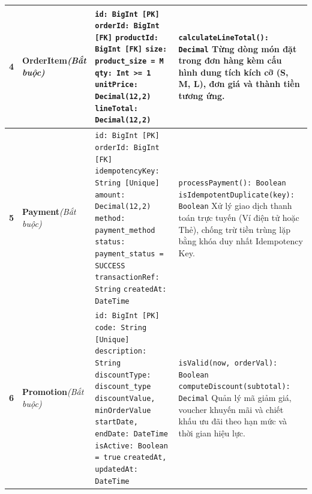 \documentclass[12pt,a4paper]{article}
\begin{document}
\begin{xltabular}{\textwidth}{|c|>{\raggedright\arraybackslash}p{3.2cm}|>{\raggedright\arraybackslash}p{4.2cm}|>{\raggedright\arraybackslash}X|}
\textbf{4} & \textbf{OrderItem}\newline\textit{(Bắt buộc)} & 
\texttt{id: BigInt [PK]}\newline
\texttt{orderId: BigInt [FK]}\newline
\texttt{productId: BigInt [FK]}\newline
\texttt{size: product\_size = M}\newline
\texttt{qty: Int >= 1}\newline
\texttt{unitPrice: Decimal(12,2)}\newline
\texttt{lineTotal: Decimal(12,2)} & 
\texttt{calculateLineTotal(): Decimal}\newline
Từng dòng món đặt trong đơn hàng kèm cấu hình dung tích kích cỡ (S, M, L), đơn giá và thành tiền tương ứng. \\
\hline

\textbf{5} & \textbf{Payment}\newline\textit{(Bắt buộc)} & 
\texttt{id: BigInt [PK]}\newline
\texttt{orderId: BigInt [FK]}\newline
\texttt{idempotencyKey: String [Unique]}\newline
\texttt{amount: Decimal(12,2)}\newline
\texttt{method: payment\_method}\newline
\texttt{status: payment\_status = SUCCESS}\newline
\texttt{transactionRef: String}\newline
\texttt{createdAt: DateTime} & 
\texttt{processPayment(): Boolean}\newline
\texttt{isIdempotentDuplicate(key): Boolean}\newline
Xử lý giao dịch thanh toán trực tuyến (Ví điện tử hoặc Thẻ), chống trừ tiền trùng lặp bằng khóa duy nhất Idempotency Key. \\
\hline

\textbf{6} & \textbf{Promotion}\newline\textit{(Bắt buộc)} & 
\texttt{id: BigInt [PK]}\newline
\texttt{code: String [Unique]}\newline
\texttt{description: String}\newline
\texttt{discountType: discount\_type}\newline
\texttt{discountValue, minOrderValue}\newline
\texttt{startDate, endDate: DateTime}\newline
\texttt{isActive: Boolean = true}\newline
\texttt{createdAt, updatedAt: DateTime} & 
\texttt{isValid(now, orderVal): Boolean}\newline
\texttt{computeDiscount(subtotal): Decimal}\newline
Quản lý mã giảm giá, voucher khuyến mãi và chiết khấu ưu đãi theo hạn mức và thời gian hiệu lực. \\
\hline


\end{xltabular}
\end{document}
